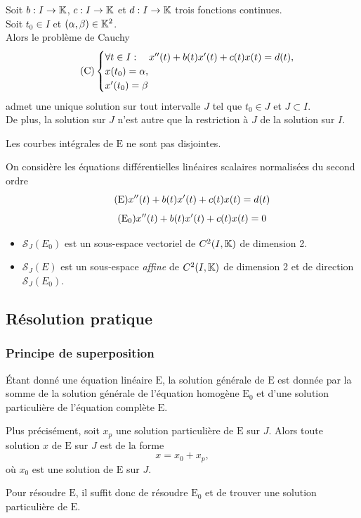 \documentclass{book}
\begin{document}
\begin{Theoreme}
Soit $b:I\to\mathbb{K}$, $c:I\to\mathbb{K}     $ et $d:I\to\mathbb{K}$
trois fonctions continues.\\
Soit $t_0\in I$ et $(\alpha,\beta)\in \mathbb{K}^2$.\\
Alors le problème de Cauchy
\[\tag{$\mathrm{C}$}
  \begin{cases}    \forall t\in I:\quad x''(t) + b(t) x'(t) + c(t) x(t) = d(t), \\
    x(t_0) =\alpha, \\
    x'(t_0) =\beta
\end{cases}\]
admet une unique solution sur tout intervalle $J$
tel que $t_0\in J$ et $J\subset I$.\\
De plus, la solution sur $J$ n'est autre que la restriction à $J$
de la solution sur $I$.
\end{Theoreme}
\begin{Remarque}
Les courbes intégrales de $\mathrm{E}$ ne sont pas disjointes.
\end{Remarque}
\begin{Theoreme}[Structure]
On considère les équations différentielles linéaires scalaires normalisées du second ordre
\[\tag{$\mathrm{E}$} x''(t) + b(t)x'(t) + c(t) x(t) = d(t)\]
\[\tag{$\mathrm{E_0}$} x''(t) + b(t)x'(t) + c(t) x(t) = 0\]
\begin{itemize}
\item $\mathcal{S}_J(E_0)$ est un sous-espace vectoriel de $C^2(I,\mathbb{K}     )$ de dimension 2.
\item $\mathcal{S}_J(E)$ est un sous-espace \emph{affine} de $C^2(I,\mathbb{K}     )$ de dimension 2 et de direction $\mathcal{S}_J(E_0)$.
\end{itemize}
\end{Theoreme}


\subsection{Résolution pratique}

\subsubsection{Principe de superposition}
\begin{Proposition}
Étant donné une équation linéaire $\mathrm{E}$,
la solution générale de $\mathrm{E}$ est donnée
par la somme de la solution générale de l'équation homogène $\mathrm{E_0}$
et d'une solution particulière de l'équation complète $\mathrm{E}$.

Plus précisément, soit $x_p$ une solution particulière de $\mathrm{E}$ sur $J$.
Alors toute solution $x$ de $\mathrm{E}$ sur $J$ est de la forme
\[x = x_0 + x_p,\]
où $x_0$ est une solution de $\mathrm{E}$ sur $J$.

Pour résoudre $\mathrm{E}$,
il suffit donc de résoudre $\mathrm{E_0}$
et de trouver une solution particulière de $\mathrm{E}$.
\end{Proposition}
\end{document}
